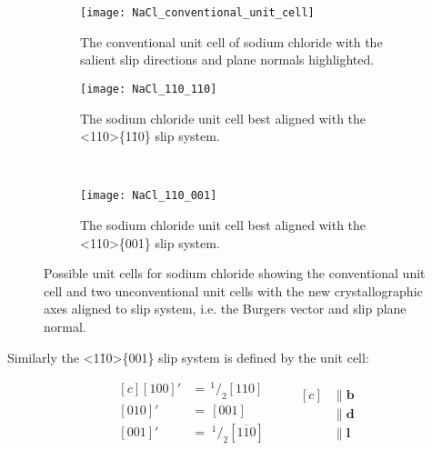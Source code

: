 \begin{figure}
\centering


    \begin{subfigure}{0.55\textwidth}
    \centering
    \texttt{[image: NaCl\_conventional\_unit\_cell]}
    \caption{The conventional unit cell of sodium chloride with the salient slip directions and plane normals highlighted. \label{fig:NaCl_conventional_cell_slip_system_marked}}
    \end{subfigure}

    \begin{subfigure}{0.4\textwidth}
    \centering
    \texttt{[image: NaCl\_110\_110]}
    \caption{The sodium chloride unit cell best aligned with the <110>\{1\={1}0\} slip system. \label{fig:NaCl_110_110_unit_cell}}
    \end{subfigure}
    ~
    \begin{subfigure}{0.4\textwidth}
    \centering
    \texttt{[image: NaCl\_110\_001]}
    \caption{The sodium chloride unit cell best aligned with the <110>\{001\} slip system. \label{fig:NaCl_110_001_unit_cell}}
    \end{subfigure}

\caption[Unconventional unit cells of rock salt to build a dislocation.]{Possible unit cells for sodium chloride showing the conventional unit cell and two unconventional unit cells with the new crystallographic axes aligned to slip system, i.e. the Burgers vector and slip plane normal.\label{fig:unconventional_NaCl_unit_cells}}
\end{figure}






Similarly the  <1\={1}0>\{001\} slip system is defined by the unit cell:

\begin{equation*}
\begin{aligned}[c]
 {[100]}' &=\, ^{1}\!/_{2} [110] \\
 {[010]}' &=\,  [001] \\
 {[001]}' &=\; ^{1}\!/_{2} [1\overline{1}0] \\
\end{aligned}
\qquad
\begin{aligned}[c]
&\parallel \mathbf{b} \\
&\parallel \mathbf{d} \\
&\parallel \mathbf{l}
\end{aligned}
\end{equation*}


